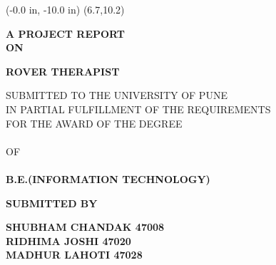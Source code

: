 \documentclass[12pt,a4paper]{article}
\begin{document}
\pagestyle{empty}

\newpage
\pagestyle{empty}
\thisfancyput(-0.0 in, -10.0 in) {\setlength{\unitlength}{1 in}\framebox(6.7,10.2)}
 
 \begin{center}
      
      \textbf{A PROJECT REPORT}\\
      \vspace{0.2 in}
      \textbf{ON}
      \vspace{0.2 in}
       
			\end{center}
\vspace{0.1 in}
	\begin{center}
		\textbf{ROVER THERAPIST}\\
	\end{center}
     \vspace{0.2 in}
		\begin{center}
	    SUBMITTED TO THE UNIVERSITY OF PUNE \\
	    IN PARTIAL FULFILLMENT OF THE REQUIREMENTS\\
	    FOR THE AWARD OF THE DEGREE \\
	    \\
	    OF\\
	    \\
	    \textbf{B.E.(INFORMATION TECHNOLOGY)}
	\end{center}
	
	\vspace{0.2 in}
	
	\begin{center}
	   \textbf{SUBMITTED BY}
	\end{center}
	\vspace{0.1 in}
	\begin{center}
	\textbf{SHUBHAM CHANDAK  47008}\\
	\textbf{RIDHIMA JOSHI  47020}\\	
	\textbf{MADHUR LAHOTI  47028}\\
	\end{center}
	
\end{document}

